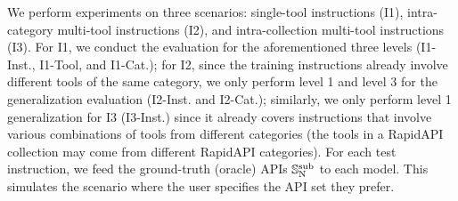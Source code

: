 We perform experiments on three scenarios: single-tool instructions (I1), intra-category multi-tool instructions (I2), and intra-collection multi-tool instructions (I3). For I1, we conduct the evaluation for the aforementioned three levels (I1-Inst., I1-Tool, and I1-Cat.); for I2, since the training instructions already involve different tools of the same category, we only perform level 1 and level 3 for the generalization evaluation (I2-Inst. and I2-Cat.); similarly, we only perform level 1 generalization for I3 (I3-Inst.) since it already covers instructions that involve various combinations of tools from different categories (the tools in a RapidAPI collection may come from different RapidAPI categories).
For each test instruction, we feed the ground-truth (oracle) APIs ${\mathbb{S}}_\text{N}^{\text{sub}}$ to each model. This simulates the scenario where the user specifies the API set they prefer.


